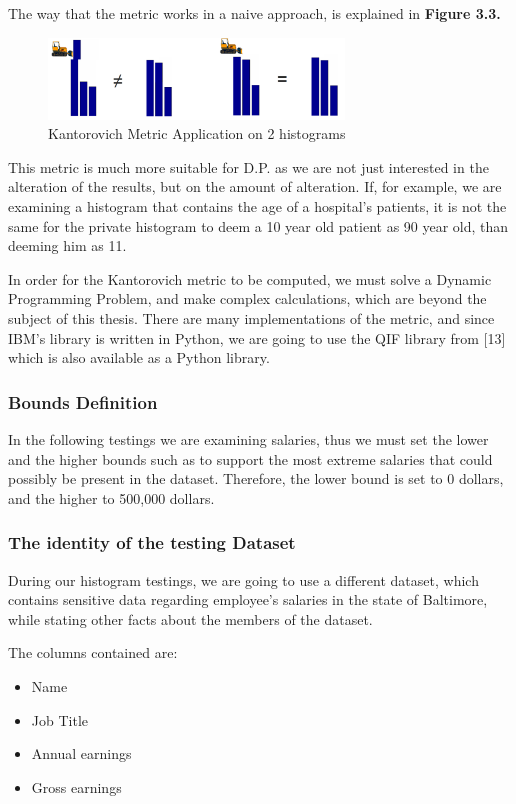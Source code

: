 The way that the metric works in a naive approach, is explained in \textbf{Figure 3.3.}

\begin{figure}[!htb]\centering
    \includegraphics[width=0.7\textwidth]{images/emd.png}
    \caption{Kantorovich Metric Application on 2 histograms}
\end{figure}

This metric is much more suitable for D.P. as we are not just interested in the alteration of the results, but on the amount of alteration. If, for example, we are examining a histogram that contains the age of a hospital's patients, it is not the same for the private histogram to deem a 10 year old patient as 90 year old, than deeming him as 11. 

In order for the Kantorovich metric to be computed, we must solve a Dynamic Programming Problem, and make complex calculations, which are beyond the subject of this thesis. There are many implementations of the metric, and since IBM's library is written in Python, we are going to use the QIF library from [13] which is also available as a Python library. 


\subsubsection{Bounds Definition}

In the following testings we are examining salaries, thus we must set the lower and the higher bounds such as to support the most extreme salaries that could possibly be present in the dataset. Therefore, the lower bound is set to 0 dollars, and the higher to 500,000 dollars.

\subsubsection{The identity of the testing Dataset}

During our histogram testings, we are going to use a different dataset, which contains  sensitive data regarding employee's salaries in the state of Baltimore, while stating other facts about the members of the dataset. 

The columns contained are: 
\begin{itemize}
    \item Name
    \item Job Title
    \item Annual earnings
    \item Gross earnings
\end{itemize}

